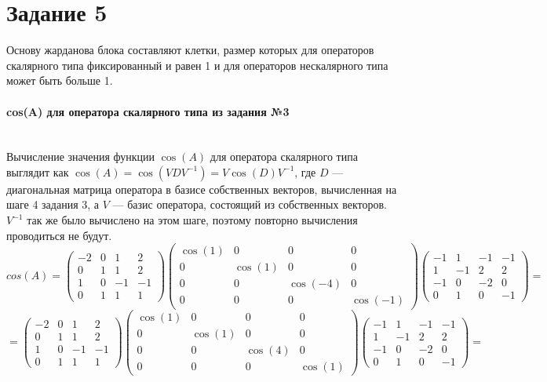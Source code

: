\documentclass{article}
\begin{document}
\section*{Задание 5}
Основу жарданова блока составляют клетки, размер которых для операторов скалярного типа фиксированный и равен 1 и для операторов нескалярного типа может быть больше 1.
\paragraph*{cos(A) для оператора скалярного типа из задания №3} \, \\
Вычисление значения функции $\cos(A)$ для оператора скалярного типа выглядит как $\cos(A) = \cos(VDV^{-1}) = V\cos(D)V^{-1}$, где $D$ --- диагональная матрица оператора в базисе собственных векторов, вычисленная на шаге 4 задания 3, а $V$ --- базис оператора, состоящий из собственных векторов. $V^{-1}$ так же было вычислено на этом шаге, поэтому повторно вычисления проводиться не будут.
$$cos(A) = \begin{pmatrix}
-2 & 0 & 1 & 2 \\
0 & 1 & 1 & 2 \\
1 & 0 & -1 & -1 \\
0 & 1 & 1 & 1
\end{pmatrix} \begin{pmatrix}
\cos(1) & 0 & 0 & 0 \\
0 & \cos(1)& 0 & 0 \\
0 & 0 & \cos(-4) & 0 \\
0 & 0 & 0 & \cos(-1)
\end{pmatrix} \begin{pmatrix}
-1 & 1 & -1 & -1 \\
1 & -1 & 2 & 2 \\
-1 & 0 & -2 & 0 \\
0 & 1 & 0 & -1
\end{pmatrix} = $$
$$= \begin{pmatrix}
-2 & 0 & 1 & 2 \\
0 & 1 & 1 & 2 \\
1 & 0 & -1 & -1 \\
0 & 1 & 1 & 1
\end{pmatrix} \begin{pmatrix}
\cos(1) & 0 & 0 & 0 \\
0 & \cos(1)& 0 & 0 \\
0 & 0 & \cos(4) & 0 \\
0 & 0 & 0 & \cos(1)
\end{pmatrix} \begin{pmatrix}
-1 & 1 & -1 & -1 \\
1 & -1 & 2 & 2 \\
-1 & 0 & -2 & 0 \\
0 & 1 & 0 & -1
\end{pmatrix} =$$
\end{document}
